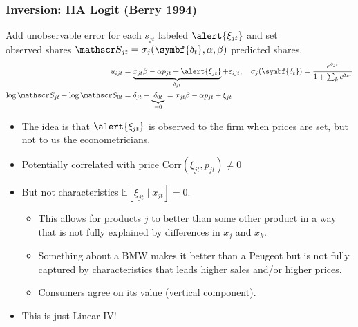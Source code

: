 \documentclass[aspectratio=169,10pt]{beamer}
\begin{document}
\begin{frame}
\frametitle{Inversion: IIA Logit (Berry 1994)}
Add unobservable error for each $s_{jt}$ labeled $\alert{\xi_{jt}}$ and set\\
 \alert{observed shares} $\calS_{jt} = \sigma_{j}(\symbf{\delta_{t}},\alpha,\beta)$ \alert{predicted shares}.
\begin{align*}
u_{ijt} &= \underbrace{x_{jt} \beta -\alpha p_{jt} + \alert{\xi_{jt}}}_{\delta_{jt}} +  \varepsilon_{ijt} , \quad 
\sigma_j(\symbf{\delta_{t}}) = \frac{e^{\delta_{jt}} }{1+\sum_k e^{\delta_{kt}} } \\
 \log \calS_{jt} - \log \calS_{0t} &= \delta_{jt} - \underbrace{\delta_{0t}}_{=0} 
 = x_{jt} \beta -\alpha p_{jt} + \xi_{jt}
\end{align*}
\vspace{-0.5cm}
\begin{itemize}
\item The idea is that $\alert{\xi_{jt}}$ is observed to the firm when prices are set, but not to us the econometricians.
\item Potentially correlated with price $\text{Corr}(\xi_{jt},p_{jt}) \neq 0$
\item But not characteristics $\mathbb{E}[\xi_{jt} \mid  x_{jt}]=0$.
\begin{itemize}
\item This allows for products $j$ to better than some other product in a way that is not fully explained by differences in $x_j$ and $x_k$.
\item Something about a BMW makes it better than a Peugeot but is not fully captured by characteristics that leads higher sales and/or higher prices.
\item Consumers agree on its value  (\alert{vertical component}).
\end{itemize}
\item This is just Linear IV!
\end{itemize}
\end{frame}
\end{document}
